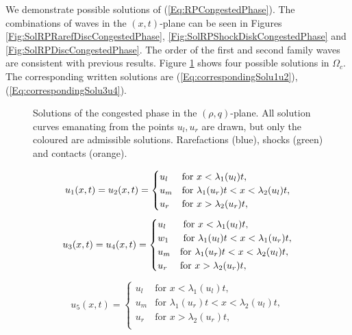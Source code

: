 \documentclass[10pt]{article}
\numberwithin{equation}{section}
\begin{document}
We demonstrate possible solutions of (\ref{Eq:RPCongestedPhase}). The combinations of waves in the $(x,t)$-plane can be seen in Figures \ref{Fig:SolRPRarefDiscCongestedPhase}, \ref{Fig:SolRPShockDiskCongestedPhase} and \ref{Fig:SolRPDiscCongestedPhase}. The order of the first and second family waves are consistent with previous results. Figure \ref{fig:SolRPCongInRhoQ} shows four possible solutions in $\Omega_c$. The corresponding written solutions are (\ref{Eq:correspondingSolu1u2}), (\ref{Eq:correspondingSolu3u4}). 
\begin{figure}
    \centering
    
    \caption{Solutions of the congested phase in the $(\rho,q)$-plane. All solution curves emanating from the points $u_l, u_r$ are drawn, but only the coloured are admissible solutions. Rarefactions (blue), shocks (green) and contacts (orange). }
    \label{fig:SolRPCongInRhoQ}
\end{figure}
\begin{align}
    u_1(x,t) =  u_2(x,t) = \begin{cases} 
    u_l & \text{for  $x < \lambda_1(u_l)t$},\\
    u_m & \text{for $\lambda_1(u_r)t < x < \lambda_2(u_l)t$}, \\
    u_r & \text{for $ x > \lambda_2(u_r)t$}, \\
    \end{cases}
    \label{Eq:correspondingSolu1u2}
\end{align}
\begin{align}
    u_3(x,t) = u_4(x,t) =\begin{cases}
    u_l  &\text{ for $x < \lambda_1(u_l)t$},\\
    w_1 &\text{ for $ \lambda_1(u_l)t < x < \lambda_1(u_r)t$},\\ 
    u_m &\text{for  $\lambda_1(u_r)t < x < \lambda_2(u_l)t$}, \\
    u_r &\text{for  $x > \lambda_2(u_r)t$}, \\
    \end{cases} 
    \label{Eq:correspondingSolu3u4}
\end{align}
\begin{align}
    u_5(x,t) = \begin{cases}
    u_l & \text{for $x < \lambda_1(u_l)t$},\\
    u_m & \text{for $\lambda_1(u_r)t < x < \lambda_2(u_l)t$}, \\
    u_r & \text{for $x> \lambda_2(u_r)t$,} \\
    \end{cases}
    \label{Eq:u_5}
\end{align}
\end{document}

